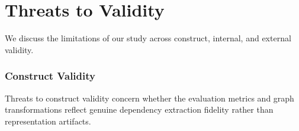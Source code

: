 \section{Threats to Validity}
\label{sec:threats_to_validity}

We discuss the limitations of our study across construct, internal, and
external validity.

\subsubsection{Construct Validity}
\label{subsec:construct_validity}

Threats to construct validity concern whether the evaluation metrics and graph
transformations reflect genuine dependency extraction fidelity rather than
representation artifacts.

